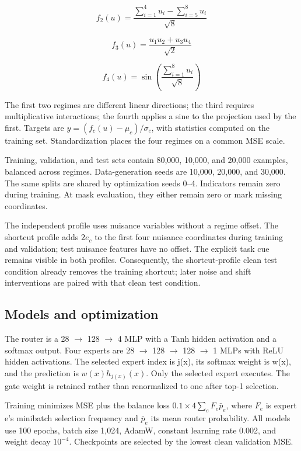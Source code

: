 \documentclass[10pt,letterpaper]{article}
\begin{document}
\[
f_2(u)=\frac{\sum_{i=1}^{4}u_i-\sum_{i=5}^{8}u_i}{\sqrt{8}}
\]

\[
f_3(u)=\frac{u_1u_2+u_3u_4}{\sqrt{2}}
\]

\[
f_4(u)=\sin\left(\frac{\sum_{i=1}^{8}u_i}{\sqrt{8}}\right)
\]

The first two regimes are different linear directions; the third requires multiplicative interactions; the fourth applies a sine to the projection used by the first. Targets are $y=(f_c(u)-\mu_c)/\sigma_c$, with statistics computed on the training set. Standardization places the four regimes on a common MSE scale.


Training, validation, and test sets contain 80,000, 10,000, and 20,000 examples, balanced across regimes. Data-generation seeds are 10,000, 20,000, and 30,000. The same splits are shared by optimization seeds 0--4. Indicators remain zero during training. At mask evaluation, they either remain zero or mark missing coordinates.


The independent profile uses nuisance variables without a regime offset. The shortcut profile adds $2e_c$ to the first four nuisance coordinates during training and validation; test nuisance features have no offset. The explicit task cue remains visible in both profiles. Consequently, the shortcut-profile clean test condition already removes the training shortcut; later noise and shift interventions are paired with that clean test condition.


\subsection{Models and optimization}

The router is a 28 \ensuremath{\rightarrow} 128 \ensuremath{\rightarrow} 4 MLP with a Tanh hidden activation and a softmax output. Four experts are 28 \ensuremath{\rightarrow} 128 \ensuremath{\rightarrow} 128 \ensuremath{\rightarrow} 1 MLPs with ReLU hidden activations. The selected expert index is j(x), its softmax weight is w(x), and the prediction is $w(x)h_{j(x)}(x)$. Only the selected expert executes. The gate weight is retained rather than renormalized to one after top-1 selection.


Training minimizes MSE plus the balance loss $0.1\times4\sum_e F_e\bar p_e$, where $F_{e}$ is expert e's minibatch selection frequency and $\bar p_e$ its mean router probability. All models use 100 epochs, batch size 1,024, AdamW, constant learning rate 0.002, and weight decay $10^{-4}$. Checkpoints are selected by the lowest clean validation MSE.
\end{document}
